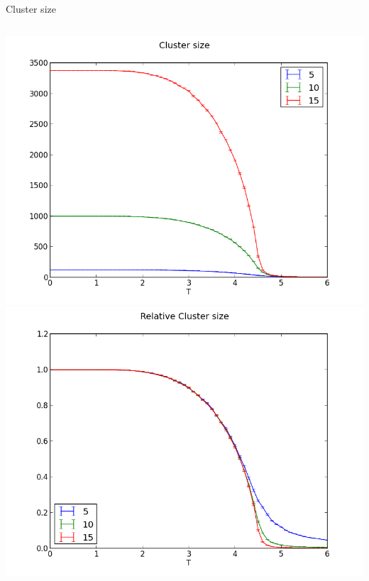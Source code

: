 \documentclass[handout]{beamer}
\begin{document}
\begin{frame}{Cluster size}
\begin{columns}[c]
	\pause
	\includegraphics[width=\textwidth]{../results/measurements/clusterSize.png}
	\pause
	\includegraphics[width=\textwidth]{../results/measurements/clusterSizeRelative.png}
\end{columns}
\note{ }
\end{frame}
\end{document}
